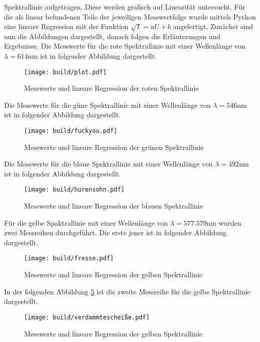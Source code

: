   Spektrallinie
  aufgetragen. Diese werden grafisch auf Linearität untersucht. Für die als linear befundenen Teile 
  der jeweiligen Messwertfolge wurde mittels Python eine lineare Regression 
  mit der Funktion $\sqrt{I}=aU+b$ angefertigt. Zunächst sind nun die Abbildungen dargestellt, 
  danach folgen die Erläuterungen und Ergebnisse.
  Die Messwerte für die rote Spektrallinie mit einer Wellenlänge von $\lambda = 614 \si{\nano\meter}$
  ist in folgender Abbildung dargestellt.
  \begin{figure}[H]
    \centering
    \texttt{[image: build/plot.pdf]}
    \caption{Messwerte und lineare Regression der roten Spektrallinie}
    \label{fig:plot}
  \end{figure}
  Die Messwerte für die güne Spektrallinie mit einer Wellenlänge von $\lambda = 546 \si{\nano\meter}$
  ist in folgender Abbildung dargestellt.
  \begin{figure}[H]
    \centering
    \texttt{[image: build/fuckyou.pdf]}
    \caption{Messwerte und lineare Regression der grünen Spektrallinie}
    \label{fig:fuck}
  \end{figure}
  Die Messwerte für die blaue Spektrallinie mit einer Wellenlänge von $\lambda = 492 \si{\nano\meter}$
  ist in folgender Abbildung dargestellt.
  \begin{figure}[H]
    \centering
    \texttt{[image: build/hurensohn.pdf]}
    \caption{Messwerte und lineare Regression der blauen Spektrallinie}
    \label{fig:hure}
  \end{figure}
  
  Für die gelbe Spaktrallinie mit einer Wellenlänge von $\lambda = 577.579 \si{\nano\meter}$
  wurden zwei Messreihen durchgeführt. Die erste jener ist in folgender Abbildung dargestellt.
  \begin{figure}[H]
    \centering
    \texttt{[image: build/fresse.pdf]}
    \caption{Messwerte und lineare Regression der gelben Spektrallinie}
    \label{fig:fresse}
  \end{figure}
  In der folgenden Abbildung \ref{fig:scheisse} ist die zweite Messreihe für die gelbe Spektrallinie
  dargestellt.
  \begin{figure}[H]
    \centering
    \texttt{[image: build/verdammtescheiße.pdf]}
    \caption{Messwerte und lineare Regression der gelben Spektrallinie}
    \label{fig:scheisse}
  \end{figure}
  
